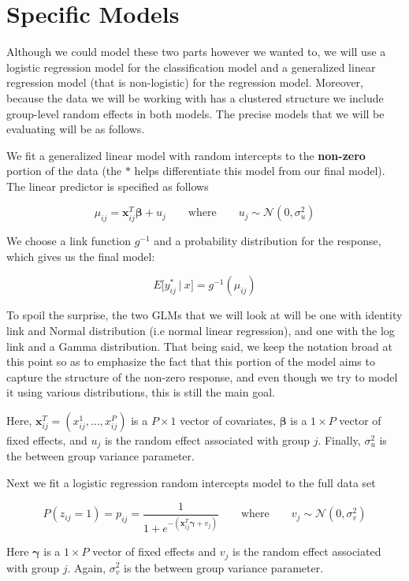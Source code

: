 \documentclass[12pt,twoside]{reedthesis}
\begin{document}
\hypertarget{specificmods}{%
\section{Specific Models}\label{specificmods}}

Although we could model these two parts however we wanted to, we will use a logistic regression model for the classification model and a generalized linear regression model (that is non-logistic) for the regression model. Moreover, because the data we will be working with has a clustered structure we include group-level random effects in both models. The precise models that we will be evaluating will be as follows.

We fit a generalized linear model with random intercepts to the \textbf{non-zero} portion of the data (the \(*\) helps differentiate this model from our final model). The linear predictor is specified as follows

\[
\mu_{ij} = \mathbf{x}_{ij}^T\boldsymbol{\beta} + u_j  \qquad \text{where} \qquad u_j \sim \mathcal{N}(0, \sigma_{u}^2)
\]

We choose a link function \(g^{-1}\) and a probability distribution for the response, which gives us the final model:

\[
E\big[y^*_{ij} \ | \ x\big] = g^{-1}(\mu_{ij})
\]

To spoil the surprise, the two GLMs that we will look at will be one with identity link and Normal distribution (i.e normal linear regression), and one with the log link and a Gamma distribution. That being said, we keep the notation broad at this point so as to emphasize the fact that this portion of the model aims to capture the structure of the non-zero response, and even though we try to model it using various distributions, this is still the main goal.

Here, \(\mathbf{x}_{ij}^T = (x^1_{ij}, ..., x^P_{ij})\) is a \(P\times 1\) vector of covariates, \(\boldsymbol{\beta}\) is a \(1\times P\) vector of fixed effects, and \(u_j\) is the random effect associated with group \(j\). Finally, \(\sigma^2_{u}\) is the between group variance parameter.

Next we fit a logistic regression random intercepts model to the full data set

\[
P(z_{ij} = 1) = p_{ij} = \frac{1}{1 + e^{-(\mathbf{x}_{ij}^T\boldsymbol{\gamma} + v_j)}} \qquad \text{where} \qquad v_j \sim \mathcal{N}(0, \sigma_{v}^2)
\]

Here \(\boldsymbol{\gamma}\) is a \(1\times P\) vector of fixed effects and \(v_j\) is the random effect associated with group \(j\). Again, \(\sigma^2_{v}\) is the between group variance parameter.
\end{document}
